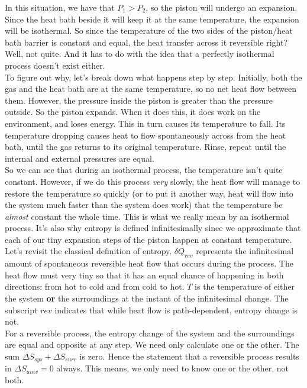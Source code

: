 In this situation, we have that $P_{1}>P_{2}$, so the piston will undergo an expansion. Since the heat bath beside it will keep it at the same temperature, the expansion will be isothermal. So since the temperature of the two sides of the piston/heat bath barrier is constant and equal, the heat transfer across it reversible right? Well, not quite. And it has to do with the idea that a perfectly isothermal process doesn't exist either. \\

To figure out why, let's break down what happens step by step. Initially, both the gas and the heat bath are at the same temperature, so no net heat flow between them. However, the pressure inside the piston is greater than the pressure outside. So the piston expands. When it does this, it does work on the environment, and loses energy. This in turn causes its temperature to fall. Its temperature dropping causes heat to flow spontaneously across from the heat bath, until the gas returns to its original temperature. Rinse, repeat until the internal and external pressures are equal. \\

So we can see that during an isothermal process, the temperature isn't quite constant. However, if we do this process \textit{very} slowly, the heat flow will manage to restore the temperature so quickly (or to put it another way, heat will flow into the system much faster than the system does work) that the temperature be \textit{almost} constant the whole time. This is what we really mean by an isothermal process. It's also why entropy is defined infinitesimally since we approximate that each of our tiny expansion steps of the piston happen at constant temperature. \\

Let's revisit the classical definition of entropy. $\delta Q_{rev}$ represents the infinitesimal amount of spontaneous reversible heat flow that occurs during the process. The heat flow must very tiny so that it has an equal chance of happening in both directions: from hot to cold and from cold to hot. $T$ is the temperature of either the system \textbf{or} the surroundings at the instant of the infinitesimal change. The subscript $rev$ indicates that while heat flow is path-dependent, entropy change is not. \\

For a reversible process, the entropy change of the system and the surroundings are equal and opposite at any step. We need only calculate one or the other. The sum $\Delta S_{sys}+\Delta S_{surr}$ is zero. Hence the statement that a reversible process results in $\Delta S_{univ}=0$ always. This means, we only need to know one or the other, not both. \\

